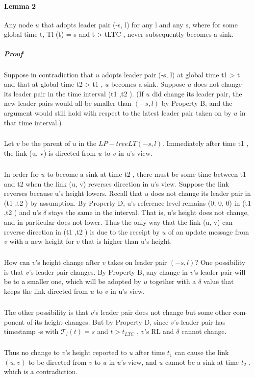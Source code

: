 \paragraph{Lemma 2}Any node $u$ that adopts leader pair (-s, l) for any l and any s, where for some global time t, Tl (t) = s and t > tLTC , never subsequently becomes a sink.
\subparagraph{Proof}Suppose in contradiction that $u$ adopts leader pair (-s, l) at global time t1 > t and that at global time t2 > t1 , $u$ becomes a sink. Suppose $u$ does not change its leader pair in the time interval (t1 ,t2 ). (If $u$ did change its leader pair, the new leader pairs would all be smaller than $(-s, l)$ by Property B, and the argument would still hold with respect to the latest leader pair taken on by $u$ in that time interval.)
\subparagraph{}Let $v$ be the parent of $u$ in the $LP-tree LT (-s, l)$. Immediately after time t1 , the link (u, v) is directed from $u$ to $v$ in u's view.
\subparagraph{}In order for $u$ to become a sink at time t2 , there must be some time between t1 and t2 when the link (u, v) reverses direction in u's view. Suppose the link reverses because u's height lowers. Recall that $u$ does not change its leader pair in (t1 ,t2 ) by assumption. By Property D, u's reference level remains (0, 0, 0) in (t1 ,t2 ) and u's $\delta$ stays the same in the interval. That is, u's height does not change, and in particular does not lower. Thus the only way that the link (u, v) can reverse direction in (t1 ,t2 ) is due to the receipt by $u$ of an update message from $v$ with a new height for $v$ that is higher than u's height.
\subparagraph{}How can $v$'s height change after $v$ takes on leader pair $(-s, l)$? One possibility is that $v$'s leader pair changes. By Property B, any change in $v$'s leader pair will be to a smaller one, which will be adopted by $u$ together with a $\delta$ value that keeps the link directed from $u$ to $v$ in u's view.
\subparagraph{}The other possibility is that $v$'s leader pair does not change but some other com- ponent of its height changes. But by Property D, since $v$'s leader pair has timestamp -s with $\mathcal{T} _l (t) = s$ and $t > t_{LTC}$ , $v$'s RL and $\delta$ cannot change.
\subparagraph{}Thus no change to $v$'s height reported to $u$ after time $t_1$ can cause the link $(u, v)$ to be directed from $v$ to $u$ in $u$'s view, and $u$ cannot be a sink at time $t_2$ , which is a contradiction.
